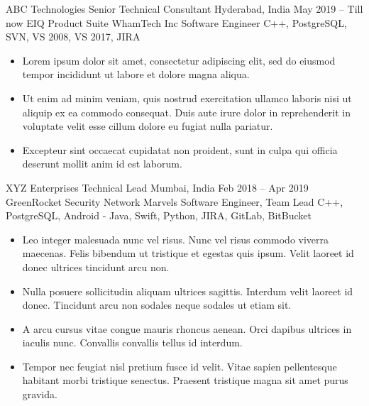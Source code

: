 \documentclass[10pt, a4paper]{cvhari}
\begin{document}

    \company
        {ABC Technologies}
        {Senior Technical Consultant}
        {Hyderabad, India}
        {May 2019 -- Till now}
    \project
        {EIQ Product Suite}
        {WhamTech Inc}
        {Software Engineer}
        {C++, PostgreSQL, SVN, VS 2008, VS 2017, JIRA}
    
    \begin{itemize}
        \item Lorem ipsum dolor sit amet, consectetur adipiscing elit, sed do eiusmod tempor incididunt ut labore et dolore magna aliqua. \smallskip
        
        \item Ut enim ad minim veniam, quis nostrud exercitation ullamco laboris nisi ut aliquip ex ea commodo consequat. Duis aute irure dolor in reprehenderit in voluptate velit esse cillum dolore eu fugiat nulla pariatur.\smallskip

        \item Excepteur sint occaecat cupidatat non proident, sunt in culpa qui officia deserunt mollit anim id est laborum.\smallskip
    \end{itemize}
    
    

\smallskip
\divider
\smallskip

    \company
        {XYZ Enterprises}
        {Technical Lead}
        {Mumbai, India}
        {Feb 2018 – Apr 2019}
        \project
            {GreenRocket Security}
            {Network Marvels}
            {Software Engineer, Team Lead}
            {C++, PostgreSQL, Android - Java, Swift, Python, JIRA, GitLab, BitBucket}
        
        \begin{itemize}
            \item Leo integer malesuada nunc vel risus. Nunc vel risus commodo viverra maecenas. Felis bibendum ut tristique et egestas quis ipsum. Velit laoreet id donec ultrices tincidunt arcu non.\smallskip
            \item Nulla posuere sollicitudin aliquam ultrices sagittis. Interdum velit laoreet id donec. Tincidunt arcu non sodales neque sodales ut etiam sit.\smallskip
            \item A arcu cursus vitae congue mauris rhoncus aenean. Orci dapibus ultrices in iaculis nunc. Convallis convallis tellus id interdum.\smallskip
            \item Tempor nec feugiat nisl pretium fusce id velit. Vitae sapien pellentesque habitant morbi tristique senectus. Praesent tristique magna sit amet purus gravida.\smallskip
        \end{itemize}
\end{document}
